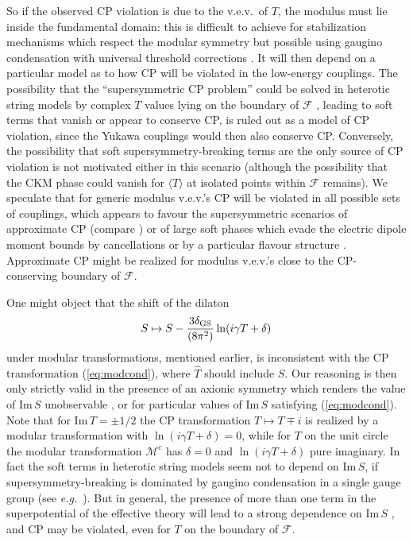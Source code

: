 \documentclass[a4paper,12pt]{article}
\begin{document}
So if the observed CP violation is due to the v.e.v.\ of $T$, the modulus must lie inside the fundamental domain: this is difficult to achieve for stabilization mechanisms which respect the modular symmetry \cite{CveticFILQ} but possible using gaugino condensation with universal threshold corrections \cite[and references therein]{BailinKL2000}. It will then depend on a particular model as to how CP will be violated in the low-energy couplings. The possibility that the ``supersymmetric CP problem'' could be solved in heterotic string models by complex $T$ values lying on the boundary of $\mathcal{F}$ \cite{IbanezLust}, leading to soft terms that vanish or appear to conserve CP, is ruled out as a model of CP violation, since the Yukawa couplings would then also conserve CP. Conversely, the possibility that soft supersymmetry-breaking terms are the only source of CP violation \cite{AbelF,Brhlik2000} is not motivated either in this scenario (although the possibility that the CKM phase could vanish for $\langle T\rangle$ at isolated points within $\mathcal{F}$ remains). We speculate that for generic modulus v.e.v.'s CP will be violated in all possible sets of couplings, which appears to favour the supersymmetric scenarios of approximate CP (compare \cite{Eyal:1998bk}) or of large soft phases which evade the electric dipole moment bounds by cancellations or by a particular flavour structure \cite{Ibrahim98,BrhlikGK99,Pokorski:2000hz}. Approximate CP might be realized for modulus v.e.v.'s close to the CP-conserving boundary of $\mathcal{F}$.

One might object that the shift of the dilaton
\[ S\mapsto S-\frac{3\delta_{\rm GS}}{(8\pi^2)} \ln (i\gamma T+\delta) \]
under modular transformations, mentioned earlier, is inconsistent with the CP transformation (\ref{eq:modcond}), where $\hat{T}$ should include $S$. Our reasoning is then only strictly valid in the presence of an axionic symmetry which renders the value of Im$\,S$ unobservable \cite{IbanezLust,Choi97,GeorgiKN}, or for particular values of Im$\,S$ satisfying (\ref{eq:modcond}). Note that for Im$\,T=\pm 1/2$ the CP transformation $T\mapsto T\mp i$ is realized by a modular transformation with $\ln(i\gamma T+\delta)=0$, while for $T$ on the unit circle the modular transformation $\mathcal{M}^c$ has $\delta=0$ and $\ln(i\gamma T+\delta)$ pure imaginary. In fact the soft terms in heterotic string models seem not to depend on Im$\,S$, if supersymmetry-breaking is dominated by gaugino condensation in a single gauge group (see {\em e.g.\/}\ \cite{Bailin:1998iz+97}). But in general, the presence of more than one term in the superpotential of the effective theory will lead to a strong dependence on Im$\,S$ \cite{Choi97}, and CP may be violated, even for $T$ on the boundary of $\mathcal{F}$.
\end{document}

